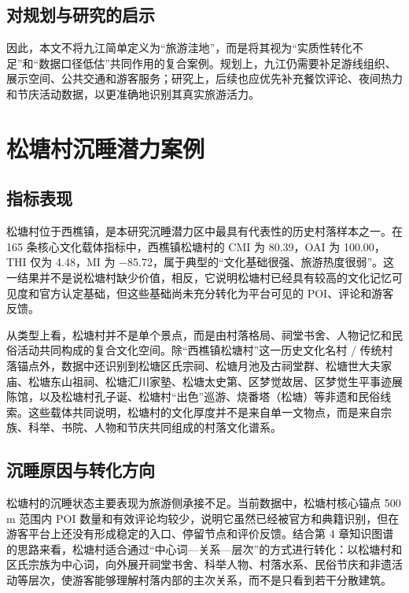 \subsection{对规划与研究的启示}\label{ux5bf9ux89c4ux5212ux4e0eux7814ux7a76ux7684ux542fux793a}

因此，本文不将九江简单定义为``旅游洼地''，而是将其视为``实质性转化不足''和``数据口径低估''共同作用的复合案例。规划上，九江仍需要补足游线组织、展示空间、公共交通和游客服务；研究上，后续也应优先补充餐饮评论、夜间热力和节庆活动数据，以更准确地识别其真实旅游活力。

\section{松塘村沉睡潜力案例}\label{ux677eux5858ux6751ux6c89ux7761ux6f5cux529bux6848ux4f8b}

\subsection{指标表现}\label{ux6307ux6807ux8868ux73b0}

松塘村位于西樵镇，是本研究沉睡潜力区中最具有代表性的历史村落样本之一。在 165 条核心文化载体指标中，西樵镇松塘村的 CMI 为 80.39，OAI 为 100.00，THI 仅为 4.48，MI 为 −85.72，属于典型的``文化基础很强、旅游热度很弱''。这一结果并不是说松塘村缺少价值，相反，它说明松塘村已经具有较高的文化记忆可见度和官方认定基础，但这些基础尚未充分转化为平台可见的 POI、评论和游客反馈。

从类型上看，松塘村并不是单个景点，而是由村落格局、祠堂书舍、人物记忆和民俗活动共同构成的复合文化空间。除``西樵镇松塘村''这一历史文化名村 / 传统村落锚点外，数据中还识别到松塘区氏宗祠、松塘月池及古祠堂群、松塘世大夫家庙、松塘东山祖祠、松塘汇川家塾、松塘太史第、区梦觉故居、区梦觉生平事迹展陈馆，以及松塘村孔子诞、松塘村``出色''巡游、烧番塔（松塘）等非遗和民俗线索。这些载体共同说明，松塘村的文化厚度并不是来自单一文物点，而是来自宗族、科举、书院、人物和节庆共同组成的村落文化谱系。

\subsection{沉睡原因与转化方向}\label{ux6c89ux7761ux539fux56e0ux4e0eux8f6cux5316ux65b9ux5411}

松塘村的沉睡状态主要表现为旅游侧承接不足。当前数据中，松塘村核心锚点 500 m 范围内 POI 数量和有效评论均较少，说明它虽然已经被官方和典籍识别，但在游客平台上还没有形成稳定的入口、停留节点和评价反馈。结合第 4 章知识图谱的思路来看，松塘村适合通过``中心词---关系---层次''的方式进行转化：以松塘村和区氏宗族为中心词，向外展开祠堂书舍、科举人物、村落水系、民俗节庆和非遗活动等层次，使游客能够理解村落内部的主次关系，而不是只看到若干分散建筑。

